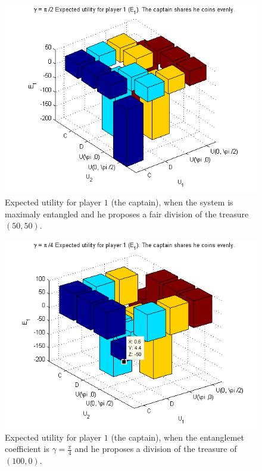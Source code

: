 \begin{figure}[h!]
\centering 
\includegraphics[scale=0.60]{Figures/1.5qubit/poorcaptain.png}
\caption{Expected utility for player $1$ (the captain), when the system is maximaly entangled and he proposes a fair division of the treasure $(50,50)$.}
\label{fig:pg_2players_99_0_1:33}
\end{figure}


\begin{figure}[h!]
\centering 
\includegraphics[scale=0.60]{Figures/1.5qubit/piadividirpor4.png}
\caption{Expected utility for player $1$ (the captain), when the entanglemet coefficient is $\gamma=\frac{\pi}{4}$ and he proposes a division of the treasure of $(100,0)$.}
\label{fig:pg_2players_99_0_1:33jesus}
\end{figure}

